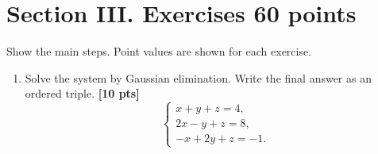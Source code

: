 \documentclass[11pt]{article}
\newif\ifshowsolutions
\newcommand{\pts}[1]{\hfill\textbf{[#1 pts]}}
\newcommand{\workarea}[1]{\ifshowsolutions\else\vspace{#1}\fi}
\newcommand{\solution}[1]{%
  \ifshowsolutions
    \par\medskip
    {\color{solutionblue}\textbf{Solution.} #1}
    \par\medskip
  \fi}
\begin{document}
\newpage
\section*{Section III. Exercises \hfill 60 points}

Show the main steps. Point values are shown for each exercise.

\begin{enumerate}
\item Solve the system by Gaussian elimination. Write the final answer as an ordered triple. \pts{10}
\[
\begin{cases}
x+y+z=4,\\
2x-y+z=8,\\
-x+2y+z=-1.
\end{cases}
\]
\workarea{2.2in}
\solution{Starting from the augmented matrix, use $R_2\leftarrow R_2-2R_1$ and $R_3\leftarrow R_3+R_1$:
\[
\left[\begin{array}{ccc|c}
1&1&1&4\\2&-1&1&8\\-1&2&1&-1
\end{array}\right]
\longrightarrow
\left[\begin{array}{ccc|c}
1&1&1&4\\0&-3&-1&0\\0&3&2&3
\end{array}\right].
\]
Adding the second row to the third gives $z=3$. Then $-3y-z=0$ gives $y=-1$, and the first equation gives $x=2$. Thus
\[
\boxed{(x,y,z)=(2,-1,3)}.
\]}




\end{enumerate}
\end{document}
